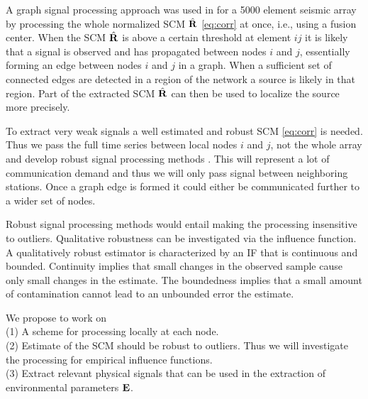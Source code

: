 
A graph signal processing approach was used in \cite{riahi2017} for a 5000 element seismic array by processing the whole normalized SCM $\hat{\bf R}$ \eqref{eq:corr} at once, i.e., using a fusion center. 
When the SCM $\hat{\bf R }$ is above a certain threshold at  element $ij$ it is likely that a signal is observed and has propagated between nodes $i$ and $j$, essentially forming an edge between nodes  $i$ and $j$ in a graph. When a sufficient set of connected edges are detected in a region of the network a source is likely in that region. Part of the extracted SCM $\hat{\bf R}$ can then be used to localize the source more precisely.

To extract very weak signals  a well estimated and robust SCM \eqref{eq:corr} is needed.  Thus we  pass the full time series between local nodes $i$ and $j$, not the whole array and develop robust signal processing methods \cite{zoubir2018}. This will represent a lot of communication demand and thus we will only pass signal between neighboring stations. Once a graph edge is formed it could either be communicated further to a wider set of nodes.

Robust signal processing methods \cite{zoubir2018} would entail making the processing insensitive to outliers. Qualitative robustness can be investigated via the influence function. A qualitatively robust estimator is characterized by an IF that is continuous and bounded. Continuity implies that small changes in the observed sample cause only small changes in the estimate. The boundedness implies that a small amount of contamination cannot lead to an unbounded error the estimate.

We propose to work on\\
(1) A scheme for processing locally at each node. \\
(2) Estimate of the SCM should be robust to outliers\cite{zoubir2018}. Thus we will investigate the processing for empirical influence functions.  %
\\
(3) Extract relevant physical signals that can be used in the extraction of environmental parameters $\bf E$.

